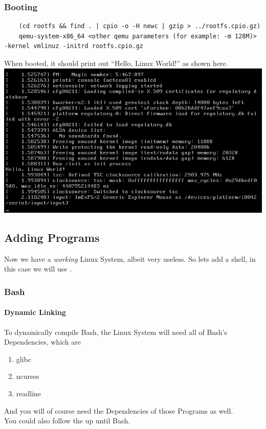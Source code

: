 \documentclass{article}
\begin{document}
			\subsubsection{Booting}
			\begin{lstlisting}
	(cd rootfs && find . | cpio -o -H newc | gzip > ../rootfs.cpio.gz)
	qemu-system-x86_64 <other qemu parameters (for example: -m 128M)> -kernel vmlinuz -initrd rootfs.cpio.gz
			\end{lstlisting}
			When booted, it should print out ``Hello, Linux World!'' as shown here.
			\\
			\includegraphics{HelloLinuxWorld.png}
		
		\subsection{Adding Programs}
		Now we have a \textit{working} Linux System, albeit very useless.
		So lets add a shell, in this case we will use .
		\subsubsection{Bash}
		\paragraph{Dynamic Linking}
		To dynamically compile Bash, the Linux System will need all of Bash's Dependencies, which are
		\begin{enumerate}
			\item glibc
			\item ncurses
			\item readline
		\end{enumerate}
		And you will of course need the Dependencies of those Programs as well.
		\\
		You could also follow the  up until Bash.
\end{document}
